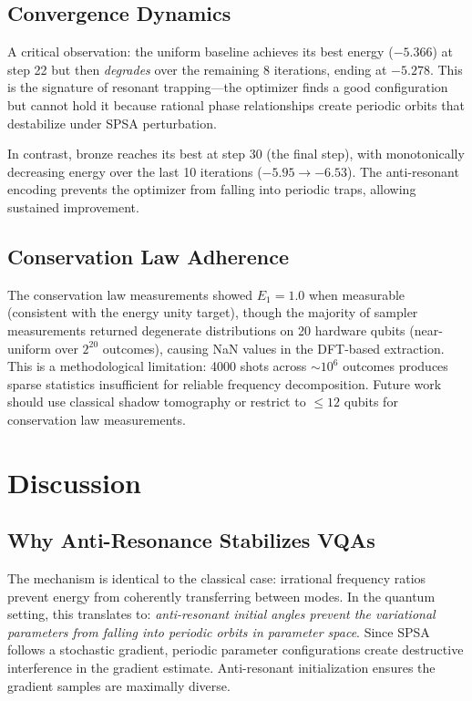 \documentclass[twocolumn,showpacs,preprintnumbers,amsmath,amssymb,aps,prl]{revtex4-2}
\begin{document}
\subsection{Convergence Dynamics}

A critical observation: the uniform baseline achieves its best energy ($-5.366$) at step 22 but then \emph{degrades} over the remaining 8 iterations, ending at $-5.278$. This is the signature of resonant trapping---the optimizer finds a good configuration but cannot hold it because rational phase relationships create periodic orbits that destabilize under SPSA perturbation.

In contrast, bronze reaches its best at step 30 (the final step), with monotonically decreasing energy over the last 10 iterations ($-5.95 \to -6.53$). The anti-resonant encoding prevents the optimizer from falling into periodic traps, allowing sustained improvement.

\subsection{Conservation Law Adherence}

The conservation law measurements showed $E_1 = 1.0$ when measurable (consistent with the energy unity target), though the majority of sampler measurements returned degenerate distributions on 20 hardware qubits (near-uniform over $2^{20}$ outcomes), causing NaN values in the DFT-based extraction. This is a methodological limitation: 4000 shots across $\sim\!10^6$ outcomes produces sparse statistics insufficient for reliable frequency decomposition. Future work should use classical shadow tomography or restrict to $\leq 12$ qubits for conservation law measurements.


\section{Discussion}
\label{sec:discussion}

\subsection{Why Anti-Resonance Stabilizes VQAs}

The mechanism is identical to the classical case: irrational frequency ratios prevent energy from coherently transferring between modes. In the quantum setting, this translates to: \emph{anti-resonant initial angles prevent the variational parameters from falling into periodic orbits in parameter space}. Since SPSA follows a stochastic gradient, periodic parameter configurations create destructive interference in the gradient estimate. Anti-resonant initialization ensures the gradient samples are maximally diverse.
\end{document}
